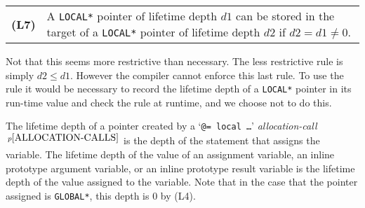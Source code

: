 \documentclass[12pt]{article}
\newcommand{\key}[1]{{\rm \bfseries #1}}
\newcommand{\pagnote}[1]{$\,^{p\pageref{#1}}$}
\newenvironment{indpar}[1][0.3in]%
	{\begin{list}{}%
		     {\setlength{\itemsep}{0in}%
		      \setlength{\topsep}{0in}%
		      \setlength{\parsep}{1ex}%
		      \setlength{\labelwidth}{#1}%
		      \setlength{\leftmargin}{#1}%
		      \addtolength{\leftmargin}{\labelsep}}%
	 \item}%
	{\end{list}}
\begin{document}
\begin{indpar}[0.2in]
\begin{tabular}{lp{5.0in}}
\key{(L7)}	& A {\tt *LOCAL*} pointer of lifetime depth $d1$
                  can be stored in
		  the target of a {\tt *LOCAL*} pointer of lifetime depth $d2$
		  if $d2 = d1 \not= 0$.
\end{tabular}
\end{indpar}

Not that this seems more restrictive than necessary.  The less
restrictive rule is simply $d2 \leq d1$.  However the compiler
cannot enforce this last rule.  To use the rule it would be necessary
to record the lifetime depth of a {\tt *LOCAL*} pointer in its
run-time value and check the rule at runtime, and we choose not
to do this.

The lifetime depth of a pointer created
by a `{\tt @= local \ldots}' {\em allocation-call}\pagnote{ALLOCATION-CALLS}
is the depth of the statement that assigns the variable.
The lifetime depth of the value of an assignment variable, an inline prototype
argument variable, or an inline prototype result variable
is the lifetime depth of the value assigned
to the variable.  Note that in the case that the pointer assigned is
{\tt *GLOBAL*}, this depth is 0 by (L4).
\end{document}
